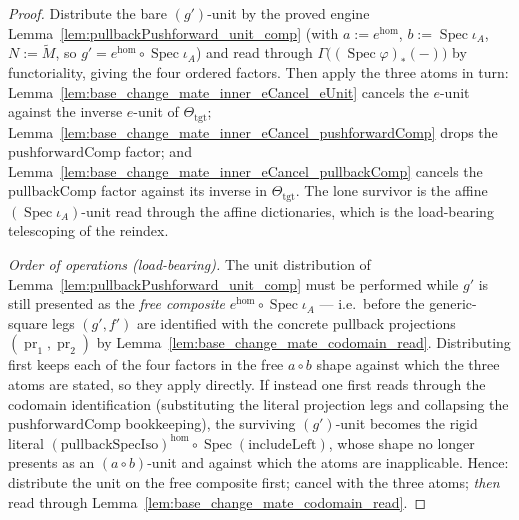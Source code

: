 \begin{proof}
  Distribute the bare \((g')\)-unit by the proved engine
  Lemma~\ref{lem:pullbackPushforward_unit_comp} (with \(a := e^{\mathrm{hom}}\),
  \(b := \operatorname{Spec}\iota_A\), \(N := \widetilde M\), so \(g' = e^{\mathrm{hom}} \circ
  \operatorname{Spec}\iota_A\)) and read through \(\Gamma\bigl((\operatorname{Spec}\varphi)_{*}(-)\bigr)\)
  by functoriality, giving the four ordered factors. Then apply the three atoms in turn:
  Lemma~\ref{lem:base_change_mate_inner_eCancel_eUnit} cancels the \(e\)-unit against the inverse
  \(e\)-unit of \(\Theta_{\mathrm{tgt}}\); Lemma~\ref{lem:base_change_mate_inner_eCancel_pushforwardComp}
  drops the \(\mathrm{pushforwardComp}\) factor; and
  Lemma~\ref{lem:base_change_mate_inner_eCancel_pullbackComp} cancels the \(\mathrm{pullbackComp}\)
  factor against its inverse in \(\Theta_{\mathrm{tgt}}\). The lone survivor is the affine
  \((\operatorname{Spec}\iota_A)\)-unit read through the affine dictionaries, which is the
  load-bearing telescoping of the reindex.

  \emph{Order of operations (load-bearing).} The unit distribution of
  Lemma~\ref{lem:pullbackPushforward_unit_comp} must be performed while \(g'\) is still presented as
  the \emph{free composite} \(e^{\mathrm{hom}} \circ \operatorname{Spec}\iota_A\) — i.e.\ before the
  generic-square legs \((g', f')\) are identified with the concrete pullback projections
  \((\operatorname{pr}_1, \operatorname{pr}_2)\) by Lemma~\ref{lem:base_change_mate_codomain_read}.
  Distributing first keeps each of the four factors in the free \(a\!\circ\!b\) shape against which the
  three atoms are stated, so they apply directly. If instead one first reads through the codomain
  identification (substituting the literal projection legs and collapsing the
  \(\mathrm{pushforwardComp}\) bookkeeping), the surviving \((g')\)-unit becomes the rigid literal
  \((\mathrm{pullbackSpecIso})^{\mathrm{hom}} \circ \operatorname{Spec}(\mathrm{includeLeft})\), whose
  shape no longer presents as an \((a\!\circ\!b)\)-unit and against which the atoms are inapplicable.
  Hence: distribute the unit on the free composite first; cancel with the three atoms; \emph{then}
  read through Lemma~\ref{lem:base_change_mate_codomain_read}.
\end{proof}

